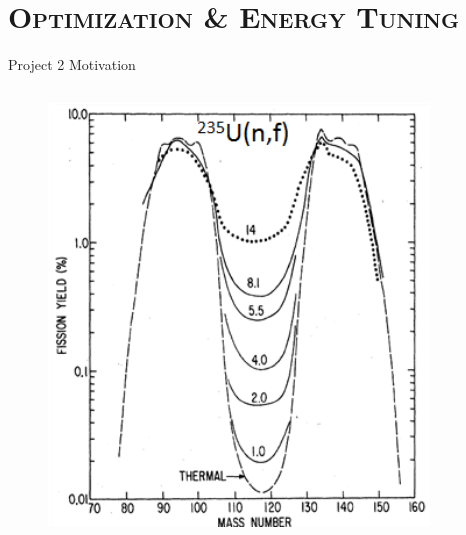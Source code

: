 \documentclass[xcolor=x11names,compress]{beamer}
\renewcommand{\(}{\begin{columns}}
\renewcommand{\)}{\end{columns}}
\newcommand{\<}[1]{\begin{column}{#1}}
\renewcommand{\>}{\end{column}}
\begin{document}
\section{\scshape Optimization \& Energy Tuning}
\begin{frame}{Project 2 Motivation}
  \begin{columns}
    \begin{column}{0.55\linewidth}
      \vspace{-.5cm}
      \begin{figure}[htp]
        \includegraphics[width=0.9\textwidth]{../figs/FP_Distribution.png}
      \end{figure}
    \end{column}
    

\end{columns}
\end{frame}
\end{document}
